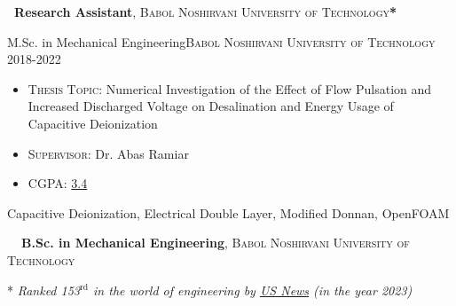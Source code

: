 %
%
%

\vspace{1pt}

\begin{scholarship}
          {\textbf{\normalfont{|}\ \textbf{Research Assistant}}, {\textsc{Babol Noshirvani University of Technology\textbf{*}}}}
\end{scholarship}

\vspace{-3pt}

\begin{experiences}
  \experience
    {}   {M.Sc. in Mechanical Engineering}{\normalfont\textsc{Babol Noshirvani University of Technology}}{}
    {2018-2022\ \ \ \ } {
          \begin{itemize}
            \item \textsc{Thesis Topic}: {Numerical Investigation of the Effect of Flow Pulsation and Increased Discharged Voltage on Desalination and Energy Usage of Capacitive Deionization}

            \item \textsc{Supervisor}: {Dr. Abas Ramiar}

            \item \textsc{CGPA}: \href{https://github.com/abzrg/cv/releases/download/v1/cgpa.org}{\color{basecolor} 3.4}
            \vspace{3pt}
          \end{itemize}
        }
        {Capacitive Deionization, Electrical Double Layer, Modified Donnan, OpenFOAM}
\end{experiences}
\vspace{-20pt}
\begin{scholarship}
  {\textbf{\normalfont{|}\ \ \textbf{B.Sc. in Mechanical Engineering}}, \textsc{Babol Noshirvani University of Technology}}
\end{scholarship}
\vspace{2pt}

* \emph{Ranked 153$^{\text{rd}}$ in the world of engineering by \href{https://www.usnews.com/education/best-global-universities/babol-noshirvani-university-of-technology-529310}{\color{basecolor}US News} (in the year 2023)}
